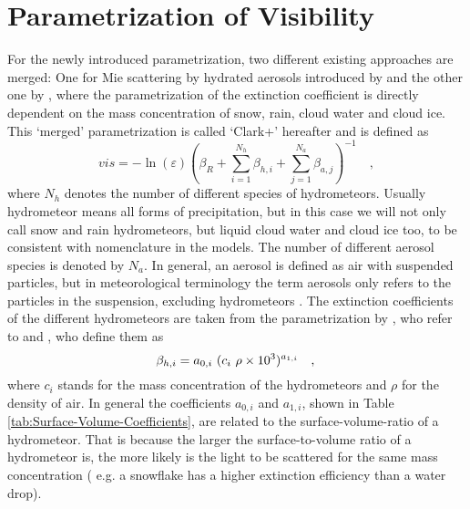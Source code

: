 
\chapter{Parametrization of Visibility}

\label{sec:param}
For the newly introduced parametrization, two different existing approaches are merged:
One for Mie scattering by hydrated aerosols introduced by \citeauthor{clark2008prediction} \cite{clark2008prediction} and the other one by \citeauthor{stoelinga1999nonhydrostatic} \cite{stoelinga1999nonhydrostatic}, where the parametrization of the extinction coefficient is directly dependent on the mass concentration of snow, rain, cloud water and cloud ice.\\
This `merged' parametrization is called `Clark+' hereafter and is defined as 
\begin{equation}
    vis  = - \ln ( \varepsilon) \left( \beta_{R} + \sum\limits_{i=1}^{N_{h}} \beta_{h,i} +  \sum\limits_{j=1}^{N_{a}} \beta_{a,j} \right) ^{-1} \quad ,
\end{equation}
where $N_{h}$ denotes the number of different species of hydrometeors. Usually hydrometeor means all forms of precipitation, but in this case we will not only call snow and rain  hydrometeors, but  liquid cloud water and cloud ice too, to be consistent with nomenclature in the models. The number of different aerosol species is denoted by $N_{{a}}$. In general, an aerosol is defined as air with suspended particles, but in meteorological terminology the term aerosols only refers to the particles in the suspension, excluding hydrometeors \cite{raith2001erde}.
The extinction coefficients of the different hydrometeors are taken from the parametrization by \citeauthor{stoelinga1999nonhydrostatic} \cite{stoelinga1999nonhydrostatic}, who refer to \citeauthor{rutledge1983mesoscale} \cite{rutledge1983mesoscale} and \citeauthor{kunkel1984parameterization} \cite{kunkel1984parameterization}, who define them as
\begin{equation}
\beta_{h,i} = a_{0,i} \ (c_{i} \ \rho \times 10^{3})^{a_{1,i}} \quad , \\
\end{equation}
where $c_{i}$ stands for the mass concentration of the hydrometeors and $\rho$ for the density of air. In general the coefficients $a_{0,i}$ and  $a_{1,i}$, shown in Table \ref{tab:Surface-Volume-Coefficients}, are related to the surface-volume-ratio of a hydrometeor. That is because the larger the surface-to-volume ratio of a hydrometeor is, the more likely is the light to be scattered for the same mass concentration ( e.g. a snowflake has a higher extinction efficiency than a water drop).\\
